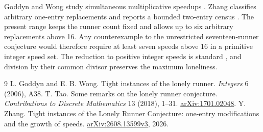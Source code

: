 \documentclass[10pt]{article}
\begin{document}
Goddyn and Wong study simultaneous multiplicative speedups
\cite{goddyn}. Zhang classifies arbitrary one-entry replacements
and reports a bounded two-entry census \cite{zhang}. The
present range keeps the runner count fixed and allows up to
six arbitrary replacements above 16. Any counterexample to
the unrestricted seventeen-runner conjecture would therefore
require at least seven speeds above 16 in a primitive integer
speed set. The reduction to positive integer speeds is standard
\cite{tao}, and division by their common divisor preserves
the maximum loneliness.

\begin{thebibliography}{9}
 L. Goddyn and E. B. Wong.
Tight instances of the lonely runner.
\emph{Integers} 6 (2006), A38.
 T. Tao. Some remarks on the lonely runner conjecture.
\emph{Contributions to Discrete Mathematics} 13 (2018), 1--31.
\href{https://arxiv.org/abs/1701.02048}{arXiv:1701.02048}.
 Y. Zhang. Tight instances of the Lonely Runner
Conjecture: one-entry modifications and the growth of speeds.
\href{https://arxiv.org/html/2608.13599v3}{arXiv:2608.13599v3}, 2026.
\end{thebibliography}
\end{document}
